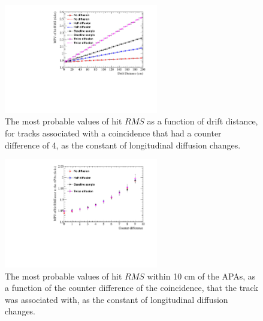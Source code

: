 \begin{figure}
  \centering
  \includegraphics[width=0.6\textwidth]{Canvas_CountDiff4_All_Positions_Diffusion}
  \caption[The drift distance dependence of diffusion in the 35 ton dataset and Monte Carlo for coincidences with a counter difference of 4, as the constant of longitudinal diffusion changes]
          {The most probable values of hit $RMS$ as a function of drift distance, for tracks associated with a coincidence that had a counter difference of 4, as the constant of longitudinal diffusion changes.}
  \label{fig:DiffLDiff_CDiff4}
\end{figure}

\begin{figure}
  \centering
  \includegraphics[width=0.6\textwidth]{Canvas_All_Angles_RMS0cm_Diffusion}
  \caption[The angular dependence of diffusion in the 35 ton dataset and Monte Carlo for hits within 10 cm of the APAs, as the constant of longitudinal changes]
          {The most probable values of hit $RMS$ within 10 cm of the APAs, as a function of the counter difference of the coincidence, that the track was associated with, as the constant of longitudinal diffusion changes.}
  \label{fig:DiffLDiff_RMS0cm}
\end{figure}

